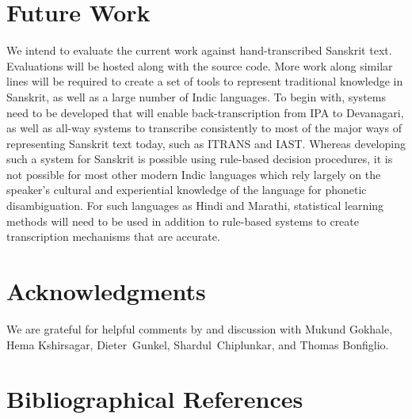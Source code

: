 \documentclass[10pt,a4paper]{article}
\begin{document}
\section{Future Work}
We intend to evaluate the current work against hand-transcribed Sanskrit text. Evaluations will be hosted along with the source code.
More work along similar lines will be required to create a set of tools to represent traditional knowledge in Sanskrit, as well as a large number of Indic languages. To begin with, systems need to be developed that will enable back-transcription from IPA to Devanagari, as well as all-way systems to transcribe consistently to most of the major ways of representing Sanskrit text today, such as ITRANS and IAST.
Whereas developing such a system for Sanskrit is possible using rule-based decision procedures, it is not possible for most other modern Indic languages which rely largely on the speaker's cultural and experiential knowledge of the language for phonetic disambiguation. For such languages as Hindi and Marathi, statistical learning methods will need to be used in addition to rule-based systems to create transcription mechanisms that are accurate.

\section{Acknowledgments}
We are grateful for helpful comments by and discussion with Mukund Gokhale, Hema Kshirsagar, Dieter~Gunkel, Shardul~Chiplunkar, and Thomas Bonfiglio.


\section{Bibliographical References}
\label{main:ref}





	
\end{document}
